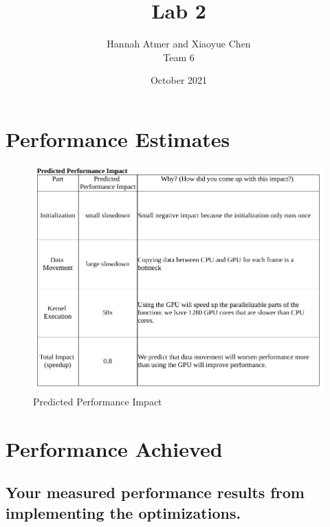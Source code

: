 \documentclass{article}
\title{Lab 2}
\author{Hannah Atmer and Xiaoyue Chen \\ Team 6}
\date{October 2021}
\begin{document}
\maketitle

\section{Performance Estimates}

\begin{figure}[h!t]
    \centering
    \includegraphics[width=1\textwidth]{predicted.png}
    \caption{Predicted Performance Impact}
    \label{fig:predicted}
\end{figure}

\section{Performance Achieved}

\subsection{Your measured performance results from implementing the optimizations.}
\end{document}
